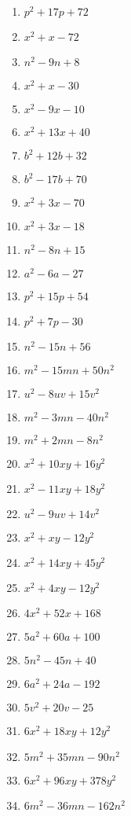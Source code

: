 \documentclass[12pt]{article}
\theoremstyle{definition}
\begin{document}
\begin{multicols}{3}
  \begin{enumerate}
  \item $p^2 + 17 p + 72$
  \item $x^2_{} + x - 72$
  \item $n^2 - 9 n + 8$
  \item $x^2 + x - 30$
  \item $x^2 - 9 x - 10$
  \item $x^2 + 13 x + 40$
  \item $b^2 + 12 b + 32$
  \item $b^2 - 17 b + 70$
  \item $x^2 + 3 x - 70$
  \item $x^2 + 3 x - 18$
  \item $n^2 - 8 n + 15$
  \item $a^2 - 6 a - 27$
  \item $p^2 + 15 p + 54$
  \item $p^2 + 7 p - 30$
  \item $n^2 - 15 n + 56$
  \item $m^2 - 15 m n + 50 n^2$
  \item $u^2 - 8 u v + 15 v^2$
  \item $m^2 - 3 m n - 40 n^2$
  \item $m^2 + 2 m n - 8 n^2$
  \item $x^2 + 10 x y + 16 y^2$
  \item $x^2 - 11 x y + 18 y^2$
  \item $u^2 - 9 u v + 14 v^2$
  \item $x^2 + x y - 12 y^2$
  \item $x^2 + 14 x y + 45 y^2$
  \item $x^2 + 4 x y - 12 y^2$
  \item $4 x^2 + 52 x + 168$
  \item $5 a^2 + 60 a + 100$
  \item $5 n^2 - 45 n + 40$
  \item $6 a^2 + 24 a - 192$
  \item $5 v^2 + 20 v - 25$
  \item $6 x^2_{} + 18 x y + 12 y^2$
  \item $5 m^2 + 35 m n - 90 n^2$
  \item $6 x^2 + 96 x y + 378 y^2$
  \item $6 m^2 - 36 m n - 162 n^2$
	\end{enumerate}
\end{multicols}
\newpage
\end{document}
